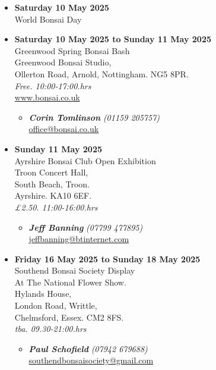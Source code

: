 \begin{itemize}
    \item \textbf{Saturday 10 May 2025}
    \\
    World Bonsai Day

    \item \textbf{Saturday 10 May 2025 to Sunday 11 May 2025}
    \\
    Greenwood Spring Bonsai Bash \\
    Greenwood Bonsai Studio, \\
    Ollerton Road, Arnold, Nottingham. NG5 8PR.
    \\
    \emph{Free. 10:00-17:00.hrs}
    \\
    \href{https://www.bonsai.co.uk}{www.bonsai.co.uk}
    \begin{itemize}
        \item \textbf{\emph{Corin Tomlinson}} \emph{(01159 205757)} \\
        \href{mailto:office@bonsai.co.uk}{office@bonsai.co.uk} 
    \end{itemize}

    \item \textbf{Sunday 11 May 2025}
    \\
    Ayrshire Bonsai Club Open Exhibition \\
    Troon Concert Hall, \\
    South Beach, Troon. \\
    Ayrshire. KA10 6EF.
    \\
    \emph{£2.50. 11:00-16:00.hrs}
    \begin{itemize}
        \item \textbf{\emph{Jeff Banning}} \emph{(07799 477895)} \\
        \href{mailto:jeffbanning@btinternet.com}{jeffbanning@btinternet.com} 
    \end{itemize}

    \item \textbf{Friday 16 May 2025 to Sunday 18 May 2025}
    \\
    Southend Bonsai Society Display \\
    At The National Flower Show. \\
    Hylands House, \\
    London Road, Writtle, \\
    Chelmsford, Essex. CM2 8FS.
    \\
    \emph{tba. 09.30-21:00.hrs}
    \begin{itemize}
        \item \textbf{\emph{Paul Schofield}} \emph{(07942 679688)} \\
        \href{mailto:southendbonsaisociety@gmail.com}{southendbonsaisociety@gmail.com} 
    \end{itemize}


\end{itemize}
